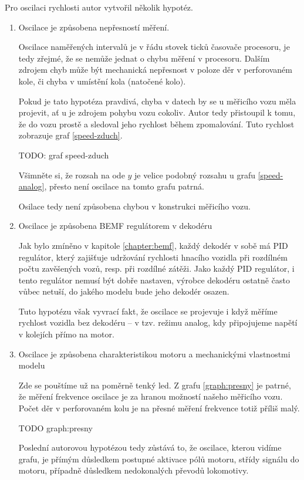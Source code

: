 Pro oscilaci rychlosti autor vytvořil několik hypotéz.

\begin{enumerate}
\item Oscilace je způsobena nepřesností měření.

Oscilace naměřených intervalů je v řádu stovek ticků časovače procesoru, je tedy
zřejmé, že se nemůže jednat o chybu měření v procesoru. Dalším zdrojem chyb
může být mechanická nepřesnost v poloze děr v perforovaném kole, či chyba v
umístění kola (natočené kolo).

Pokud je tato hypotéza pravdivá, chyba v datech by se u měřicího vozu měla
projevit, ať u je zdrojem pohybu vozu cokoliv. Autor tedy přistoupil k tomu,
že do vozu prostě  a sledoval jeho rychlost během zpomalování.
Tuto rychlost zobrazuje graf \ref{speed-zduch}.

TODO: graf speed-zduch

Všimněte si, že rozsah na ode $y$ je velice podobný rozsahu u grafu
\ref{speed-analog}, přesto není oscilace na tomto grafu patrná.

Osilace tedy není způsobena chybou v konstrukci měřicího vozu.

\item Oscilace je způsobena BEMF regulátorem v dekodéru

Jak bylo zmíněno v kapitole \ref{chapter:bemf}, každý dekodér v sobě má PID
regulátor, který zajišťuje udržování rychlosti hnacího vozidla při rozdílném
počtu zavěšených vozů, resp. při rozdílné zátěži. Jako každý PID regulátor,
i tento regulátor nemusí být dobře nastaven, výrobce dekodéru ostatně často
vůbec netuší, do jakého modelu bude jeho dekodér osazen.

Tuto hypotézu však vyvrací fakt, že oscilace se projevuje i když měříme rychlost
vozidla bez dekodéru -- v tzv. režimu analog, kdy připojujeme napětí v kolejích
přímo na motor.

\item Oscilace je způsobena charakteristikou motoru a mechanickými vlastnostmi
modelu

Zde se pouštíme už na poměrně tenký led. Z grafu \ref{graph:presny} je patrné,
že měření frekvence oscilace je za hranou možností našeho měřicího vozu. Počet
děr v perforovaném kolu je na přesné měření frekvence totiž příliš malý.

TODO graph:presny

Poslední autorovou hypotézou tedy zůstává to, že oscilace, kterou vidíme grafu,
je přímým důsledkem postupné aktivace pólů motoru, střídy signálu do motoru,
případně důsledkem nedokonalých převodů lokomotivy.


\end{enumerate}
